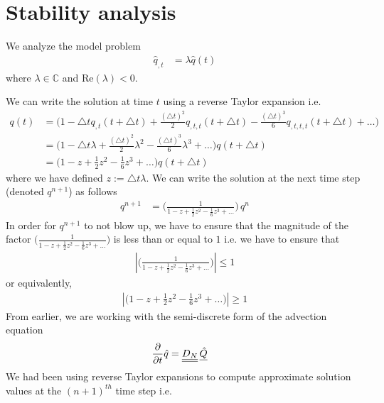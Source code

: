 
\section*{Stability analysis}
We analyze the model problem
\begin{align*}
	\hat{q}_{, t} & = \lambda \hat{q}(t)
\end{align*}
where $\lambda \in \mathbb{C}$ and $\text{Re}(\lambda) < 0$.
\par
We can write the solution at time $t$ using a reverse Taylor expansion i.e.
\begin{align*}
	q(t) & = \Big( 1 - \triangle t q_{, t}(t + \triangle t) + \frac{(\triangle t)^{2}}{2} q_{, t, t}(t + \triangle t) - \frac{(\triangle t)^{3}}{6} q_{, t, t, t}(t + \triangle t) + \hdots \Big) \\
		 & = \Big( 1 - \triangle t \lambda  + \frac{(\triangle t)^{2}}{2} \lambda^{2} - \frac{(\triangle t)^{3}}{6} \lambda^{3} + \hdots \Big) q(t + \triangle t) \\
		 & = \Big( 1 - z  + \frac{1}{2} z^{2} - \frac{1}{6} z^{3} + \hdots \Big) q(t + \triangle t)
\end{align*}
where we have defined $z := \triangle t \lambda$.
We can write the solution at the next time step (denoted $q^{n+1}$) as follows
\begin{align*}
	q^{n+1} & = \Bigg( \frac{1}{1 - z  + \frac{1}{2} z^{2} - \frac{1}{6} z^{3} + \hdots} \Bigg) \, q^{n}
\end{align*}
In order for $q^{n+1}$ to not blow up, we have to ensure that the magnitude of the factor $\Bigg( \frac{1}{1 - z  + \frac{1}{2} z^{2} - \frac{1}{6} z^{3} + \hdots} \Bigg)$ is less than or equal to $1$ i.e. we have to ensure that 
\begin{align*}
	\left\lvert \Bigg( \frac{1}{1 - z  + \frac{1}{2} z^{2} - \frac{1}{6} z^{3} + \hdots} \Bigg) \right\rvert  \leq 1 
\end{align*}
or equivalently,
\begin{align*}
	\left\lvert \Bigg( 1 - z  + \frac{1}{2} z^{2} - \frac{1}{6} z^{3} + \hdots \Bigg) \right\rvert \geq 1
\end{align*}
From earlier, we are working with the semi-discrete form of the advection equation
\begin{align*}
	\frac{\partial}{\partial t} \hat{q} & = {\underline{\underline{D_{N}}}} \, {\underline{\hat{Q}}}
\end{align*} 
We had been using reverse Taylor expansions to compute approximate solution values at the $(n+1)^{th}$ time step i.e.
